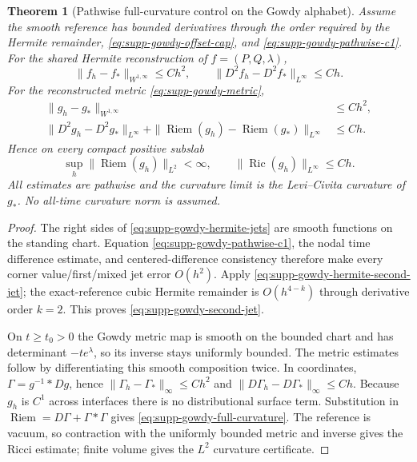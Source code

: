 \documentclass[11pt]{article}
\newtheorem{theorem}{Theorem}[section]
\numberwithin{equation}{section}
\theoremstyle{definition}
\theoremstyle{remark}
\begin{document}
\begin{theorem}[Pathwise full-curvature control on the Gowdy alphabet]
\label{thm:supp-gowdy-full-curvature}
Assume the smooth reference has bounded derivatives through the order required
by the Hermite remainder, \eqref{eq:supp-gowdy-offset-cap}, and
\eqref{eq:supp-gowdy-pathwise-c1}.  For the shared Hermite reconstruction of
$f=(P,Q,\lambda)$,
\begin{equation}
 \|f_h-f_*\|_{W^{1,\infty}}\le Ch^2,
 \qquad
 \|D^2f_h-D^2f_*\|_{L^\infty}\le Ch.
 \label{eq:supp-gowdy-second-jet}
\end{equation}
For the reconstructed metric \eqref{eq:supp-gowdy-metric},
\begin{align}
 \|g_h-g_*\|_{W^{1,\infty}}&\le Ch^2,\nonumber\\
 \|D^2g_h-D^2g_*\|_{L^\infty}
 +\|\operatorname{Riem}(g_h)-\operatorname{Riem}(g_*)\|_{L^\infty}
 &\le Ch.
 \label{eq:supp-gowdy-full-curvature}
\end{align}
Hence on every compact positive subslab
\begin{equation}
 \sup_h\|\operatorname{Riem}(g_h)\|_{L^2}<\infty,
 \qquad \|\operatorname{Ric}(g_h)\|_{L^\infty}\le Ch.
 \label{eq:supp-gowdy-curvature-certificate}
\end{equation}
All estimates are pathwise and the curvature limit is the Levi--Civita
curvature of $g_*$.  No all-time curvature norm is assumed.
\end{theorem}
\begin{proof}
The right sides of \eqref{eq:supp-gowdy-hermite-jets} are smooth functions on
the standing chart.  Equation \eqref{eq:supp-gowdy-pathwise-c1}, the nodal time
difference estimate, and centered-difference consistency therefore make every
corner value/first/mixed jet error $O(h^2)$.  Apply
\eqref{eq:supp-gowdy-hermite-second-jet}; the exact-reference cubic Hermite
remainder is $O(h^{4-k})$ through derivative order $k=2$.  This proves
\eqref{eq:supp-gowdy-second-jet}.

On $t\ge t_0>0$ the Gowdy metric map is smooth on the bounded chart and has
determinant $-te^\lambda$, so its inverse stays uniformly bounded.  The metric
estimates follow by differentiating this smooth composition twice.  In
coordinates, $\Gamma=g^{-1}*Dg$, hence
$\|\Gamma_h-\Gamma_*\|_\infty\le Ch^2$ and
$\|D\Gamma_h-D\Gamma_*\|_\infty\le Ch$.  Because $g_h$ is $C^1$ across
interfaces there is no distributional surface term.  Substitution in
$\operatorname{Riem}=D\Gamma+\Gamma*\Gamma$ gives
\eqref{eq:supp-gowdy-full-curvature}.  The reference is vacuum, so contraction
with the uniformly bounded metric and inverse gives the Ricci estimate; finite
volume gives the $L^2$ curvature certificate.
\end{proof}
\end{document}
